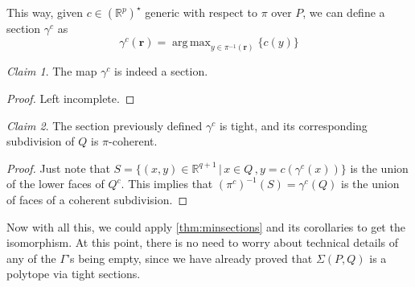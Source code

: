 \documentclass[10pt,a4paper]{article}
\DeclareMathOperator*{\argmax}{arg\,max}
\newcommand{\RR}{\mathbb{R}}
\theoremstyle{plain}
\theoremstyle{remark}
\newtheorem{claim}{Claim}
\theoremstyle{definition}
\begin{document}




This way, given $c\in (\RR^p)^\star$ generic with respect to $\pi$ over $P$, we can define a section $\gamma^c$ as
\begin{equation}
\gamma^c(\bm r) = \argmax_{y \in \pi^{-1}(\bm r)}\{ c(y) \}
\end{equation}
\begin{claim} 
	The map $\gamma^c$ is indeed a section.
\end{claim}
\begin{proof}
	Left incomplete.
\end{proof}

\begin{claim}
	The section previously defined $\gamma^c$ is tight,
	and its corresponding subdivision of $Q$ is $\pi$-coherent.
\end{claim}
\begin{proof} 
	Just note that $S=\{ (x,y) \in \RR^{q+1} \, | \, x\in Q \, , y=c(\gamma^c(x)) \}$ is the union of the lower faces of $Q^c$. 
	This implies that $(\pi^c)^{-1}(S)=\gamma^c(Q)$ is the union of faces of a coherent subdivision.  
\end{proof}

Now with all this, we could apply \cref{thm:minsections}
and its corollaries to get the isomorphism. 
At this point, there is no need to worry about technical details of 
any of the $\Gamma$'s being empty,
since we have already proved that $\Sigma(P,Q)$ is a polytope via
tight sections.





\end{document}
